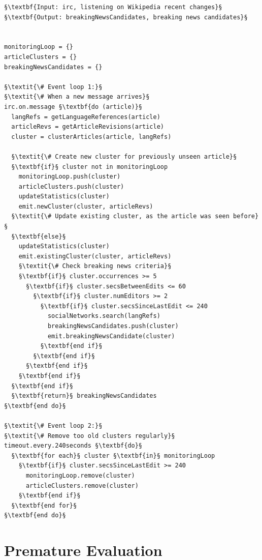 \documentclass{www13-companion-accepted}
\begin{document}
\begin{lstlisting}[caption=The two main event loops
  of the application,
  label=code:pseudocode, float=b!]
§\textbf{Input: irc, listening on Wikipedia recent changes}§ 
§\textbf{Output: breakingNewsCandidates, breaking news candidates}§ 


monitoringLoop = {}
articleClusters = {}
breakingNewsCandidates = {}
 
§\textit{\# Event loop 1:}§
§\textit{\# When a new message arrives}§
irc.on.message §\textbf{do (article)}§
  langRefs = getLanguageReferences(article)
  articleRevs = getArticleRevisions(article)
  cluster = clusterArticles(article, langRefs)  
  
  §\textit{\# Create new cluster for previously unseen article}§
  §\textbf{if}§ cluster not in monitoringLoop
    monitoringLoop.push(cluster)
    articleClusters.push(cluster)
    updateStatistics(cluster)
    emit.newCluster(cluster, articleRevs)    
  §\textit{\# Update existing cluster, as the article was seen before}§
  §\textbf{else}§
    updateStatistics(cluster)
    emit.existingCluster(cluster, articleRevs)
    §\textit{\# Check breaking news criteria}§
    §\textbf{if}§ cluster.occurrences >= 5
      §\textbf{if}§ cluster.secsBetweenEdits <= 60      
        §\textbf{if}§ cluster.numEditors >= 2
          §\textbf{if}§ cluster.secsSinceLastEdit <= 240
            socialNetworks.search(langRefs)
            breakingNewsCandidates.push(cluster)
            emit.breakingNewsCandidate(cluster)            
          §\textbf{end if}§          
        §\textbf{end if}§  
      §\textbf{end if}§        
    §\textbf{end if}§          
  §\textbf{end if}§
  §\textbf{return}§ breakingNewsCandidates
§\textbf{end do}§

§\textit{\# Event loop 2:}§
§\textit{\# Remove too old clusters regularly}§
timeout.every.240seconds §\textbf{do}§
  §\textbf{for each}§ cluster §\textbf{in}§ monitoringLoop
    §\textbf{if}§ cluster.secsSinceLastEdit >= 240
      monitoringLoop.remove(cluster)
      articleClusters.remove(cluster)
    §\textbf{end if}§
  §\textbf{end for}§ 
§\textbf{end do}§
\end{lstlisting}

\section{Premature Evaluation}
\label{sec:premature-evaluation}
\end{document}
